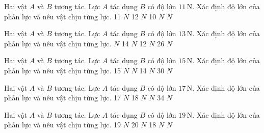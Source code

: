 \begin{ex}
Hai vật $A$ và $B$ tương tác. Lực $A$ tác dụng $B$ có độ lớn $11\,\text{N}$. Xác định độ lớn của phản lực và nêu vật chịu từng lực.
\choice
{11 $N$}
{12 $N$}
{10 $N$}
{ $N$}
\end{ex}

\begin{ex}
Hai vật $A$ và $B$ tương tác. Lực $A$ tác dụng $B$ có độ lớn $13\,\text{N}$. Xác định độ lớn của phản lực và nêu vật chịu từng lực.
\choice
{ $N$}
{14 $N$}
{12 $N$}
{26 $N$}
\end{ex}

\begin{ex}
Hai vật $A$ và $B$ tương tác. Lực $A$ tác dụng $B$ có độ lớn $15\,\text{N}$. Xác định độ lớn của phản lực và nêu vật chịu từng lực.
\choice
{15 $N$}
{ $N$}
{14 $N$}
{30 $N$}
\end{ex}

\begin{ex}
Hai vật $A$ và $B$ tương tác. Lực $A$ tác dụng $B$ có độ lớn $17\,\text{N}$. Xác định độ lớn của phản lực và nêu vật chịu từng lực.
\choice
{17 $N$}
{18 $N$}
{ $N$}
{34 $N$}
\end{ex}

\begin{ex}
Hai vật $A$ và $B$ tương tác. Lực $A$ tác dụng $B$ có độ lớn $19\,\text{N}$. Xác định độ lớn của phản lực và nêu vật chịu từng lực.
\choice
{19 $N$}
{20 $N$}
{18 $N$}
{ $N$}
\end{ex}

